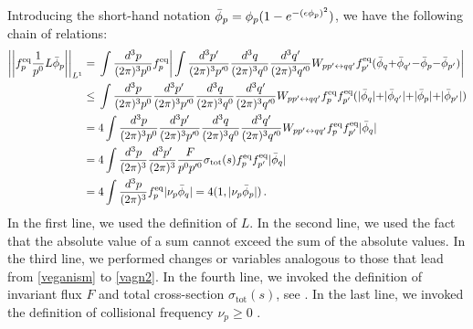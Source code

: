 \documentclass[a4paper, amsfonts, amssymb, amsmath, reprint, showkeys, nofootinbib, twoside, onecolumn,notitlepage,,longbibliography]{revtex4-2}
\theoremstyle{definition}
\theoremstyle{theorem}
\theoremstyle{corollary}
\begin{document}
Introducing the short-hand notation $\Bar{\phi}_p =\phi_p(1- e^{-(\epsilon\phi_p)^2})$,
we have the following chain of relations:
\begin{equation}\label{fiursto}
\begin{split}
\bigg|\bigg| f_p^\text{eq} \dfrac{1}{p^0}L\Bar{\phi}_p \bigg| \bigg|_{L^1}={}& \int \dfrac{d^3 p}{(2\pi)^3 p^0} f^\text{eq}_p \bigg| \int \dfrac{d^3p'}{(2\pi)^3p'^0} \dfrac{d^3q}{(2\pi)^3q^0} \dfrac{d^3q'}{(2\pi)^3q'^0} W_{pp'\leftrightarrow qq'} f^{\text{eq}}_{p'}(\Bar{\phi}_q{+}\Bar{\phi}_{q'}{-}\Bar{\phi}_p{-}\Bar{\phi}_{p'}) \bigg| \\  
\leq {}& \int \dfrac{d^3 p}{(2\pi)^3 p^0}   \dfrac{d^3p'}{(2\pi)^3p'^0} \dfrac{d^3q}{(2\pi)^3q^0} \dfrac{d^3q'}{(2\pi)^3q'^0} W_{pp'\leftrightarrow qq'} f^\text{eq}_p f^{\text{eq}}_{p'}(|\Bar{\phi}_q|{+}|\Bar{\phi}_{q'}|{+}|\Bar{\phi}_p|{+}|\Bar{\phi}_{p'}|)  \\ 
= {}& 4\int \dfrac{d^3 p}{(2\pi)^3 p^0}   \dfrac{d^3p'}{(2\pi)^3p'^0} \dfrac{d^3q}{(2\pi)^3q^0} \dfrac{d^3q'}{(2\pi)^3q'^0} W_{pp'\leftrightarrow qq'} f^\text{eq}_p f^{\text{eq}}_{p'}|\Bar{\phi}_q| \\ 
= {}& 4\int \dfrac{d^3 p}{(2\pi)^3}   \dfrac{d^3p'}{(2\pi)^3} \dfrac{F}{p^0p'^0} \sigma_{\text{tot}}(s)  f^\text{eq}_p f^{\text{eq}}_{p'}|\Bar{\phi}_q| \\
= {}& 4\int \dfrac{d^3 p}{(2\pi)^3 }     f^\text{eq}_p|\nu_p\Bar{\phi}_q| =4(1,|\nu_p\Bar{\phi}_p|) \, . \\
\end{split} 
\end{equation}
In the first line, we used the definition of $L$. In the second line, we used the fact that the absolute value of a sum cannot exceed the sum of the absolute values. In the third line, we performed changes or variables analogous to those that lead from \eqref{veganism} to \eqref{vagn2}. In the fourth line, we invoked the definition of invariant flux $F$ and total cross-section $\sigma_{\text{tot}}(s)$, see \cite[\S I.2.d]{Groot1980RelativisticKT}. In the last line, we invoked the definition of collisional frequency $\nu_p \geq 0$ \cite{Strain2010}.
\end{document}
